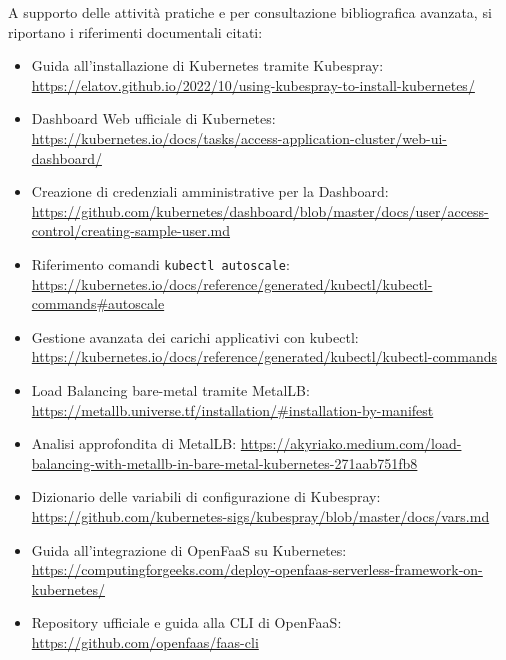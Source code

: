 \documentclass[11pt, a4paper]{article}
\begin{document}
A supporto delle attività pratiche e per consultazione bibliografica avanzata, si riportano i riferimenti documentali citati:
\begin{itemize}[noitemsep]
    \item Guida all'installazione di Kubernetes tramite Kubespray: \url{https://elatov.github.io/2022/10/using-kubespray-to-install-kubernetes/}
    \item Dashboard Web ufficiale di Kubernetes: \url{https://kubernetes.io/docs/tasks/access-application-cluster/web-ui-dashboard/}
    \item Creazione di credenziali amministrative per la Dashboard: \url{https://github.com/kubernetes/dashboard/blob/master/docs/user/access-control/creating-sample-user.md}
    \item Riferimento comandi \texttt{kubectl autoscale}: \url{https://kubernetes.io/docs/reference/generated/kubectl/kubectl-commands#autoscale}
    \item Gestione avanzata dei carichi applicativi con kubectl: \url{https://kubernetes.io/docs/reference/generated/kubectl/kubectl-commands}
    \item Load Balancing bare-metal tramite MetalLB: \url{https://metallb.universe.tf/installation/#installation-by-manifest}
    \item Analisi approfondita di MetalLB: \url{https://akyriako.medium.com/load-balancing-with-metallb-in-bare-metal-kubernetes-271aab751fb8}
    \item Dizionario delle variabili di configurazione di Kubespray: \url{https://github.com/kubernetes-sigs/kubespray/blob/master/docs/vars.md}
    \item Guida all'integrazione di OpenFaaS su Kubernetes: \url{https://computingforgeeks.com/deploy-openfaas-serverless-framework-on-kubernetes/}
    \item Repository ufficiale e guida alla CLI di OpenFaaS: \url{https://github.com/openfaas/faas-cli}
\end{itemize}
\end{document}
